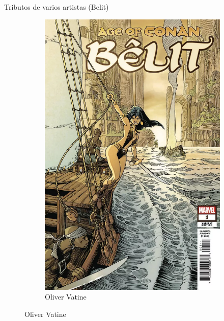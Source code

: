 \begin{frame}{Tributos de varios artistas (Belit)}
\begin{figure}[htp]
\begin{subfigure}[b]{0.22\textwidth}
			\includegraphics[width=\textwidth]{img/tributos/OliverVatine}
			\caption{Oliver Vatine}
		\end{subfigure}
	\end{figure}
\end{frame}
\note[itemize]{
	\item
}

